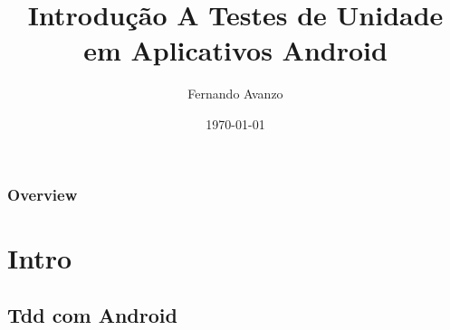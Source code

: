 \documentclass{beamer}
\title[TDD com Android]{Introdução A Testes de Unidade em Aplicativos Android}
\author{Fernando Avanzo} %
\institute[] 
{ %
\medskip
\textit{fernando.avanzo@gmail.com} %
}
\date{\today} %
\begin{document}
\begin{frame}
\titlepage %
\end{frame}

\begin{frame}
\frametitle{Overview} 
\tableofcontents %
\end{frame}


\section{Intro} %

\subsection{Tdd com Android} %
\end{document}
